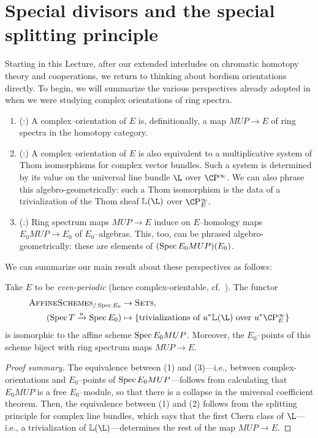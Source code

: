 \section{Special divisors and the special splitting principle}\label{MSUDay}

Starting in this Lecture, after our extended interludes on chromatic homotopy theory and cooperations, we return to thinking about bordism orientations directly.  To begin, we will summarize the various perspectives already adopted in  when we were studying complex orientations of ring spectra.
\begin{enumerate}
\item (:) A complex--orientation of \(E\) is, definitionally, a map \(MUP \to E\) of ring spectra in the homotopy category.
\item (:) A complex--orientation of \(E\) is also equivalent to a multiplicative system of Thom isomorphisms for complex vector bundles.  Such a system is determined by its value on the universal line bundle \(\L\) over \(\CP^\infty\).  We can also phrase this algebro-geometrically: such a Thom isomorphism is the data of a trivialization of the Thom sheaf \(\ThomSheaf{\L}\) over \(\CP^\infty_E\).
\item (:) Ring spectrum maps \(MUP \to E\) induce on \(E\)--homology maps \(E_0 MUP \to E_0\) of \(E_0\)--algebras.  This, too, can be phrased algebro-geometrically: these are elements of \((\operatorname{Spec} E_0 MUP)(E_0)\).
\end{enumerate}
We can summarize our main result about these perspectives as follows:
\begin{theorem}\label{BUZTriumvirate}
Take \(E\) to be \emph{even-periodic} (hence complex-orientable, cf.\ ).  The functor
\begin{align*}
\CatOf{AffineSchemes}_{/\Spec E_0} & \to \CatOf{Sets}, \\
(\Spec T \xrightarrow{u} \Spec E_0) & \mapsto \left\{ \text{trivializations of \(u^* \ThomSheaf{\L}\) over \(u^* \CP^\infty_E\)} \right\}
\end{align*}
is isomorphic to the affine scheme \(\operatorname{Spec} E_0 MUP\).  Moreover, the \(E_0\)--points of this scheme biject with ring spectrum maps \(MUP \to E\).
\end{theorem}
\begin{proof}[Proof summary]
The equivalence between (1) and (3)---i.e., between complex-orientations and \(E_0\)--points of \(\operatorname{Spec} E_0 MUP\)---follows from calculating that \(E_0 MUP\) is a free \(E_0\)--module, so that there is a collapse in the universal coefficient theorem.  Then, the equivalence between (1) and (2) follows from the splitting principle for complex line bundles, which says that the first Chern class of \(\L\)---i.e., a trivialization of \(\ThomSheaf{\L}\)---determines the rest of the map \(MUP \to E\).
\end{proof}

